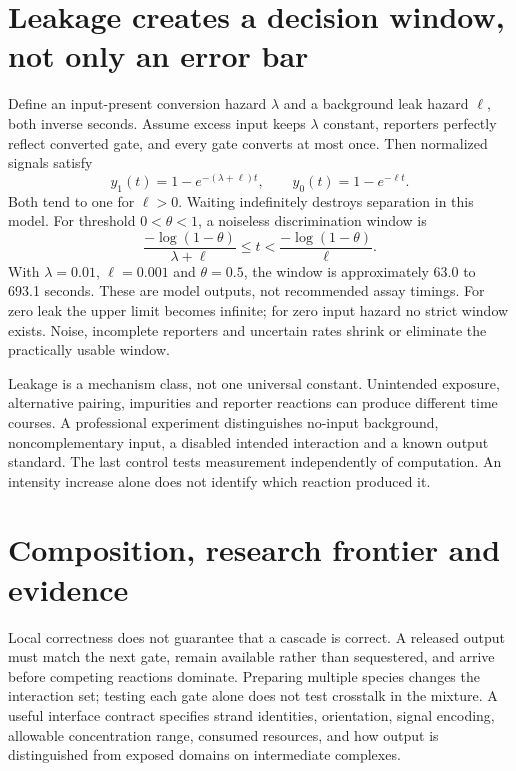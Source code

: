 \section{Leakage creates a decision window, not only an error bar}
Define an input-present conversion hazard $\lambda$ and a background leak
hazard $\ell$, both inverse seconds. Assume excess input keeps $\lambda$
constant, reporters perfectly reflect converted gate, and every gate converts
at most once. Then normalized signals satisfy
\begin{equation}
 y_1(t)=1-e^{-(\lambda+\ell)t},\qquad
 y_0(t)=1-e^{-\ell t}.
\end{equation}
Both tend to one for $\ell>0$. Waiting indefinitely destroys separation in
this model. For threshold $0<\theta<1$, a noiseless discrimination window is
\begin{equation}
 \frac{-\log(1-\theta)}{\lambda+\ell}\leq t
 <\frac{-\log(1-\theta)}{\ell}.
\end{equation}
With $\lambda=0.01$, $\ell=0.001$ and $\theta=0.5$, the window is approximately
63.0 to 693.1 seconds. These are model outputs, not recommended assay timings.
For zero leak the upper limit becomes infinite; for zero input hazard no
strict window exists. Noise, incomplete reporters and uncertain rates shrink
or eliminate the practically usable window.

Leakage is a mechanism class, not one universal constant. Unintended exposure,
alternative pairing, impurities and reporter reactions can produce different
time courses. A professional experiment distinguishes no-input background,
noncomplementary input, a disabled intended interaction and a known output
standard. The last control tests measurement independently of computation.
An intensity increase alone does not identify which reaction produced it.

\section{Composition, research frontier and evidence}
Local correctness does not guarantee that a cascade is correct. A released
output must match the next gate, remain available rather than sequestered,
and arrive before competing reactions dominate. Preparing multiple species
changes the interaction set; testing each gate alone does not test crosstalk
in the mixture. A useful interface contract specifies strand identities,
orientation, signal encoding, allowable concentration range, consumed resources,
and how output is distinguished from exposed domains on intermediate complexes.

